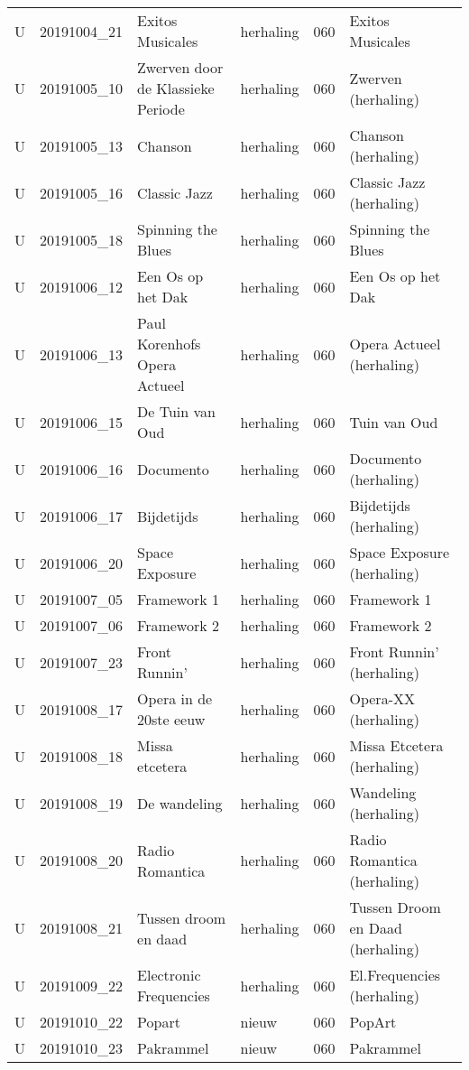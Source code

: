 \documentclass[]{article}
\begin{document}
\begin{longtable}[l]{llllll}
U & 20191004\_21 & Exitos Musicales & herhaling & 060 & Exitos Musicales\\
\addlinespace
U & 20191005\_10 & Zwerven door de Klassieke Periode & herhaling & 060 & Zwerven (herhaling)\\
U & 20191005\_13 & Chanson & herhaling & 060 & Chanson (herhaling)\\
U & 20191005\_16 & Classic Jazz & herhaling & 060 & Classic Jazz (herhaling)\\
U & 20191005\_18 & Spinning the Blues & herhaling & 060 & Spinning the Blues\\
U & 20191006\_12 & Een Os op het Dak & herhaling & 060 & Een Os op het Dak\\
\addlinespace
U & 20191006\_13 & Paul Korenhofs Opera Actueel & herhaling & 060 & Opera Actueel (herhaling)\\
U & 20191006\_15 & De Tuin van Oud & herhaling & 060 & Tuin van Oud\\
U & 20191006\_16 & Documento & herhaling & 060 & Documento (herhaling)\\
U & 20191006\_17 & Bijdetijds & herhaling & 060 & Bijdetijds (herhaling)\\
U & 20191006\_20 & Space Exposure & herhaling & 060 & Space Exposure (herhaling)\\
\addlinespace
U & 20191007\_05 & Framework 1 & herhaling & 060 & Framework 1\\
U & 20191007\_06 & Framework 2 & herhaling & 060 & Framework 2\\
U & 20191007\_23 & Front Runnin’ & herhaling & 060 & Front Runnin' (herhaling)\\
U & 20191008\_17 & Opera in de 20ste eeuw & herhaling & 060 & Opera-XX (herhaling)\\
U & 20191008\_18 & Missa etcetera & herhaling & 060 & Missa Etcetera (herhaling)\\
\addlinespace
U & 20191008\_19 & De wandeling & herhaling & 060 & Wandeling (herhaling)\\
U & 20191008\_20 & Radio Romantica & herhaling & 060 & Radio Romantica (herhaling)\\
U & 20191008\_21 & Tussen droom en daad & herhaling & 060 & Tussen Droom en Daad (herhaling)\\
U & 20191009\_22 & Electronic Frequencies & herhaling & 060 & El.Frequencies (herhaling)\\
U & 20191010\_22 & Popart & nieuw & 060 & PopArt\\
\addlinespace
U & 20191010\_23 & Pakrammel & nieuw & 060 & Pakrammel\\

\end{longtable}
\end{document}
